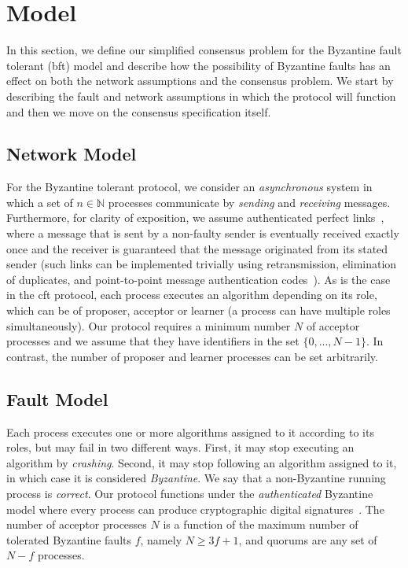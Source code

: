 \section{Model} \label{bft_model}

In this section, we define our simplified consensus problem for the Byzantine fault tolerant (\acrshort{bft}) model and describe how the possibility of Byzantine faults has an effect on both the network assumptions and the consensus problem. We start by describing the fault and network assumptions in which the protocol will function and then we move on the consensus specification itself.

\subsection{Network Model}
For the Byzantine tolerant protocol, we consider an \emph{asynchronous} system in which a set of $n \in \mathbb{N}$ processes communicate by \emph{sending} and \emph{receiving} messages. Furthermore, for clarity of exposition, we assume authenticated perfect links~\cite{cgr:book}, where a message that is sent by a non-faulty sender is eventually received exactly once and the receiver is guaranteed that the message originated from its stated sender (such links can be implemented trivially using retransmission, elimination of duplicates, and point-to-point message authentication codes~\cite{cgr:book}). As is the case in the \acrshort{cft} protocol, each process executes an algorithm depending on its role, which can be of proposer, acceptor or learner (a process can have multiple roles simultaneously). Our protocol requires a minimum number $N$ of acceptor processes and we assume that they have identifiers in the set $\{0,...,N-1\}$. In contrast, the number of proposer and learner processes can be set arbitrarily.

\subsection{Fault Model}
Each process executes one or more algorithms assigned to it according to its roles, but may fail in two different ways. First, it may stop executing an algorithm by \emph{crashing}. Second, it may stop following an algorithm assigned to it, in which case it is considered \emph{Byzantine}. We say that a non-Byzantine running process is \emph{correct}. Our protocol functions under the \emph{authenticated} Byzantine model where every process can produce cryptographic digital signatures~\cite{vukolic2012quorum}. The number of acceptor processes $N$ is a function of the maximum number of tolerated Byzantine faults $f$, namely $N \ge 3f+1$, and quorums are any set of $N-f$ processes. 

